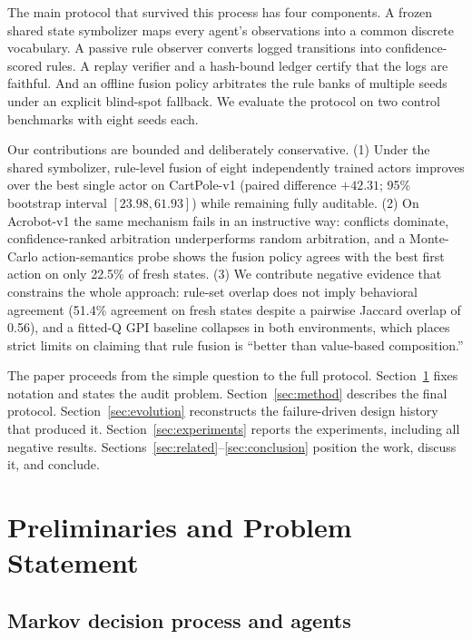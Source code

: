 \documentclass[11pt]{article}
\begin{document}
The main protocol that survived this process has four components. A frozen shared state symbolizer
maps every agent's observations into a common discrete vocabulary. A passive rule observer converts
logged transitions into confidence-scored rules. A replay verifier and a hash-bound ledger certify
that the logs are faithful. And an offline fusion policy arbitrates the rule banks of multiple seeds
under an explicit blind-spot fallback. We evaluate the protocol on two control benchmarks with eight
seeds each.

Our contributions are bounded and deliberately conservative. (1) Under the shared symbolizer,
rule-level fusion of eight independently trained actors improves over the best single actor on
CartPole-v1 (paired difference $+42.31$; 95\% bootstrap interval $[23.98,61.93]$) while remaining
fully auditable. (2) On Acrobot-v1 the same mechanism fails in an instructive way: conflicts dominate,
confidence-ranked arbitration underperforms random arbitration, and a Monte-Carlo action-semantics
probe shows the fusion policy agrees with the best first action on only 22.5\% of fresh states.
(3) We contribute negative evidence that constrains the whole approach: rule-set overlap does not
imply behavioral agreement (51.4\% agreement on fresh states despite a pairwise Jaccard overlap of
0.56), and a fitted-Q GPI baseline collapses in both environments, which places strict limits on
claiming that rule fusion is ``better than value-based composition.''

The paper proceeds from the simple question to the full protocol. Section~\ref{sec:prelim} fixes
notation and states the audit problem. Section~\ref{sec:method} describes the final protocol.
Section~\ref{sec:evolution} reconstructs the failure-driven design history that produced it.
Section~\ref{sec:experiments} reports the experiments, including all negative results.
Sections~\ref{sec:related}--\ref{sec:conclusion} position the work, discuss it, and conclude.

\section{Preliminaries and Problem Statement}
\label{sec:prelim}

\subsection{Markov decision process and agents}
\label{sec:prelim:mdp}
\end{document}
